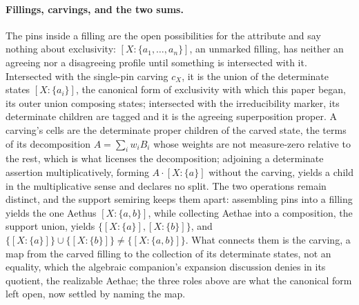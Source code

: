 \documentclass[11pt]{article}
\begin{document}
\paragraph{Fillings, carvings, and the two sums.} The pins inside a filling are the open possibilities for the attribute and say nothing about exclusivity: $[X : \{a_1, \ldots, a_n\}]$, an unmarked filling, has neither an agreeing nor a disagreeing profile until something is intersected with it. Intersected with the single-pin carving $c_X$, it is the union of the determinate states $[X : \{a_i\}]$, the canonical form of exclusivity with which this paper began, its outer union composing states; intersected with the irreducibility marker, its determinate children are tagged and it is the agreeing superposition proper. A carving's cells are the determinate proper children of the carved state, the terms of its decomposition $A = \sum_i w_i B_i$ whose weights are not measure-zero relative to the rest, which is what licenses the decomposition; adjoining a determinate assertion multiplicatively, forming $A \cdot [X : \{a\}]$ without the carving, yields a child in the multiplicative sense and declares no split. The two operations remain distinct, and the support semiring keeps them apart: assembling pins into a filling yields the one Aethus $[X : \{a, b\}]$, while collecting Aethae into a composition, the support union, yields $\{[X : \{a\}], [X : \{b\}]\}$, and $\{[X : \{a\}]\} \cup \{[X : \{b\}]\} \ne \{[X : \{a, b\}]\}$. What connects them is the carving, a map from the carved filling to the collection of its determinate states, not an equality, which the algebraic companion's expansion discussion denies in its quotient, the realizable Aethae; the three roles above are what the canonical form left open, now settled by naming the map.
\end{document}
